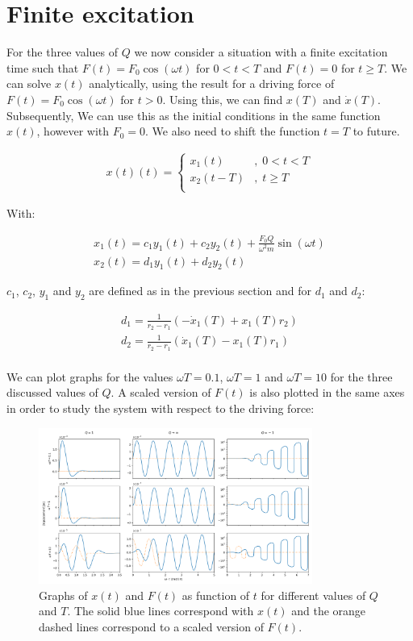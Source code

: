 \section{Finite excitation}

For the three values of $Q$ we now consider a situation with a finite excitation time such that $F(t) = F_0 \cos(\omega t)$ for $0 < t < T$ and $F(t) = 0$ for $t \geq T$. We can solve $x(t)$ analytically, using the result for a driving force of $F(t) = F_0 \cos(\omega t)$ for $t > 0$. Using this, we can find $x(T)$ and $\dot{x}(T)$. Subsequently, We can use this as the initial conditions in the same function $x(t)$, however with $F_0 = 0$. We also need to shift the function $t=T$ to future.

\begin{align*}
	x(t)(t) = \begin{cases}
		x_1(t) & , \; 0 < t < T \\
		x_2(t-T) & , \; t \geq T \\
		\end{cases}
\end{align*}

With:

\begin{align*}
	x_1(t) = c_1 y_1(t) + c_2 y_2(t) + \frac{F_0 Q}{\omega^2 m}\sin(\omega t) \\
	x_2(t) = d_1 y_1(t) + d_2 y_2(t)
\end{align*}

$c_1$, $c_2$, $y_1$ and $y_2$ are defined as in the previous section and for $d_1$ and $d_2$:

\begin{align*}
	d_1 = \frac{1}{r_2-r_1} \left( -\dot{x}_1(T) + x_1(T) r_2 \right) \\
	d_2 = \frac{1}{r_2-r_1} \left( \dot{x}_1(T)  - x_1(T) r_1 \right) \\
\end{align*}

We can plot graphs for the values $\omega T = 0.1$, $\omega T = 1$ and $\omega T = 10$ for the three discussed values of $Q$. A scaled version of $F(t)$ is also plotted in the same axes in order to study the system with respect to the driving force:

\begin{figure}[h!]
	\centering
	\includegraphics[width=0.8\textwidth]{figures/graph_q2.png}
	\caption{Graphs of $x(t)$ and $F(t)$  as function of $t$ for different values of $Q$ and $T$. The solid blue lines correspond with $x(t)$ and the orange dashed lines correspond to a scaled version of $F(t)$.}
	\label{fig_q1}
\end{figure}

